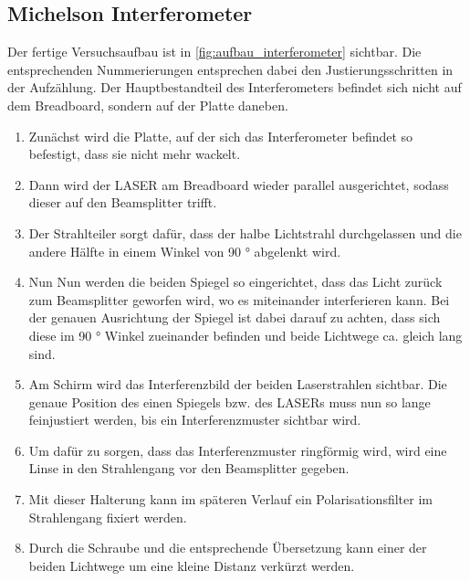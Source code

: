 \documentclass[12pt,english,ngerman]{scrartcl}
\begin{document}
\subsection{Michelson Interferometer}

Der fertige Versuchsaufbau ist in \autoref{fig:aufbau_interferometer} sichtbar.
Die entsprechenden Nummerierungen entsprechen dabei den Justierungsschritten in
der Aufzählung. Der Hauptbestandteil des Interferometers befindet sich nicht
auf dem Breadboard, sondern auf der Platte daneben.

\begin{enumerate}
	\item Zunächst wird die Platte, auf der sich das Interferometer befindet so
	      befestigt, dass sie nicht mehr wackelt.
	\item Dann wird der LASER am Breadboard wieder parallel ausgerichtet, sodass dieser
	      auf den Beamsplitter trifft.
	\item Der Strahlteiler sorgt dafür, dass der halbe Lichtstrahl durchgelassen und die
	      andere Hälfte in einem Winkel von 90 ° abgelenkt wird.
	\item Nun Nun werden die beiden Spiegel so eingerichtet, dass das Licht zurück zum
	      Beamsplitter geworfen wird, wo es miteinander interferieren kann. Bei der
	      genauen Ausrichtung der Spiegel ist dabei darauf zu achten, dass sich diese im
	      90 ° Winkel zueinander befinden und beide Lichtwege ca. gleich lang sind.
	\item Am Schirm wird das Interferenzbild der beiden Laserstrahlen sichtbar. Die
	      genaue Position des einen Spiegels bzw. des LASERs muss nun so lange
	      feinjustiert werden, bis ein Interferenzmuster sichtbar wird.
	\item Um dafür zu sorgen, dass das Interferenzmuster ringförmig wird, wird eine Linse
	      in den Strahlengang vor den Beamsplitter gegeben.
	\item Mit dieser Halterung kann im späteren Verlauf ein Polarisationsfilter im
	      Strahlengang fixiert werden.
	\item Durch die Schraube und die entsprechende Übersetzung kann einer der beiden
	      Lichtwege um eine kleine Distanz verkürzt werden.
\end{enumerate}
\end{document}
